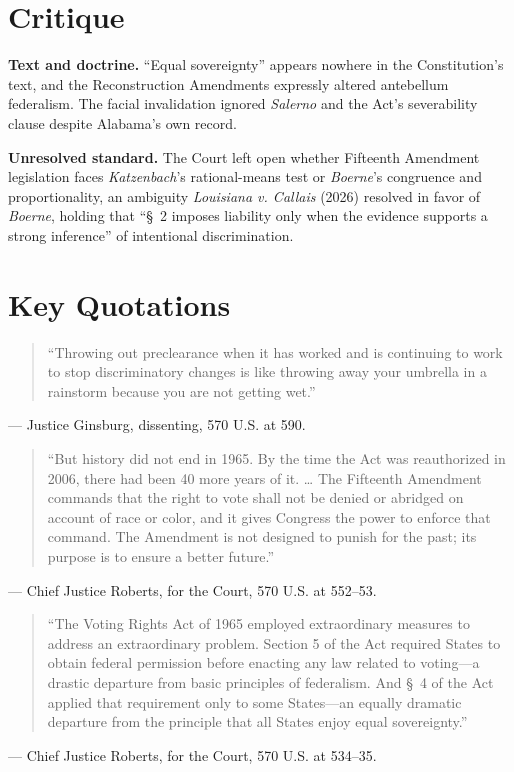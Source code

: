 \documentclass[12pt]{article}
\begin{document}
\section{Critique}

\textbf{Text and doctrine.} ``Equal sovereignty'' appears nowhere in the Constitution's text, and the Reconstruction Amendments expressly altered antebellum federalism. The facial invalidation ignored \textit{Salerno} and the Act's severability clause despite Alabama's own record.

\textbf{Unresolved standard.} The Court left open whether Fifteenth Amendment legislation faces \textit{Katzenbach}'s rational-means test or \textit{Boerne}'s congruence and proportionality, an ambiguity \textit{Louisiana v. Callais} (2026) resolved in favor of \textit{Boerne}, holding that ``\S~2 imposes liability only when the evidence supports a strong inference'' of intentional discrimination.

\section{Key Quotations}

\begin{quote}
``Throwing out preclearance when it has worked and is continuing to work to stop discriminatory changes is like throwing away your umbrella in a rainstorm because you are not getting wet.''
\end{quote}
\noindent --- Justice Ginsburg, dissenting, 570 U.S. at 590.

\begin{quote}
``But history did not end in 1965. By the time the Act was reauthorized in 2006, there had been 40 more years of it. \ldots{} The Fifteenth Amendment commands that the right to vote shall not be denied or abridged on account of race or color, and it gives Congress the power to enforce that command. The Amendment is not designed to punish for the past; its purpose is to ensure a better future.''
\end{quote}
\noindent --- Chief Justice Roberts, for the Court, 570 U.S. at 552--53.

\begin{quote}
``The Voting Rights Act of 1965 employed extraordinary measures to address an extraordinary problem. Section 5 of the Act required States to obtain federal permission before enacting any law related to voting---a drastic departure from basic principles of federalism. And \S~4 of the Act applied that requirement only to some States---an equally dramatic departure from the principle that all States enjoy equal sovereignty.''
\end{quote}
\noindent --- Chief Justice Roberts, for the Court, 570 U.S. at 534--35.
\end{document}
